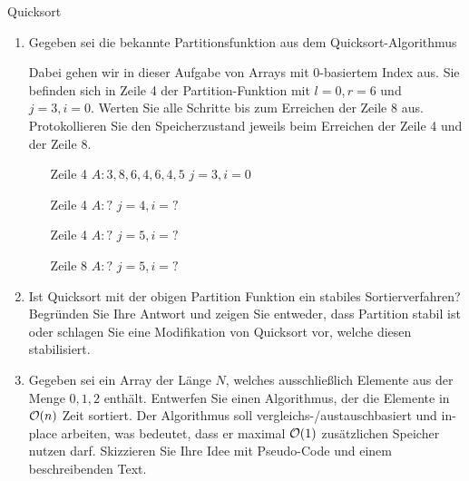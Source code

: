 \documentclass{article}
\begin{document}
\begin{exercise}{Quicksort}
  \begin{enumerate}
    \item
          Gegeben sei die bekannte Partitionsfunktion aus dem Quicksort-Algorithmus
          
          Dabei gehen wir in dieser Aufgabe von Arrays mit 0-basiertem Index aus. Sie befinden sich in Zeile 4 der Partition-Funktion mit $l = 0, r = 6$ und $j = 3, i = 0$. Werten Sie alle Schritte bis zum Erreichen der Zeile 8 aus. Protokollieren Sie den Speicherzustand jeweils beim Erreichen der Zeile 4 und der Zeile 8.
          \begin{itemize}
            \item[Zeile 4] $A: 3, 8, 6, 4, 6, 4, 5$ \hfill $j = 3, i = 0$
            \item[Zeile 4] $A: ?$ \hfill $j = 4, i = ?$
            \item[Zeile 4] $A: ?$ \hfill $j = 5, i = ?$
            \item[Zeile 8] $A: ?$ \hfill $j = 5, i = ?$
          \end{itemize}
    \item Ist Quicksort mit der obigen Partition Funktion ein stabiles Sortierverfahren? Begründen Sie Ihre Antwort und zeigen Sie entweder, dass Partition stabil ist oder schlagen Sie eine Modifikation von Quicksort vor, welche diesen stabilisiert.
    \item Gegeben sei ein Array der Länge $N$, welches ausschließlich Elemente aus der Menge $0,1,2$ enthält. Entwerfen Sie einen Algorithmus, der die Elemente in $\mathcal{O}(n)$ Zeit sortiert. Der Algorithmus soll vergleichs-/austauschbasiert und in-place arbeiten, was bedeutet, dass er maximal $\mathcal{O}(1)$ zusätzlichen Speicher nutzen darf. Skizzieren Sie Ihre Idee mit Pseudo-Code und einem beschreibenden Text.
  \end{enumerate}


\end{exercise}
\end{document}
